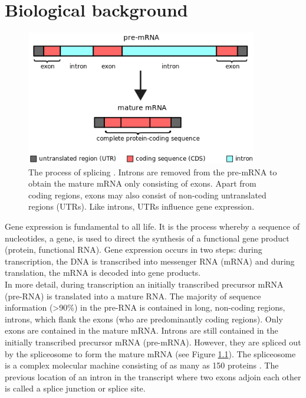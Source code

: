 \chapter{\label{ch:2-litreview}Biological background} %

\minitoc

\begin{figure}[h]
	\centering\includegraphics[width=0.9\textwidth]{../visualizations/ch2-biobackground/pre-mrna2mrna.png} 
	\caption
	{The process of splicing \cite{img:mrna}. Introns are removed from the pre-mRNA to obtain the mature mRNA only consisting of exons. Apart from coding regions, exons may also consist of non-coding untranslated regions (UTRs). Like introns, UTRs influence gene expression. 
	}
	\label{fig:pre-mrna2mrna}
\end{figure}

Gene expression is fundamental to all life. It is the process whereby a sequence of nucleotides, a gene, is used to direct the synthesis of a functional gene product (protein, functional RNA). Gene expression occurs in two steps: during transcription, the DNA is transcribed into messenger RNA (mRNA) and during translation, the mRNA is decoded into gene products.\\
In more detail, during transcription an initially transcribed precursor mRNA (pre-RNA) is translated into a mature RNA. 
The majority of sequence information (>90\%) in the pre-RNA is contained in long, non-coding regions, introns, which flank the exons (who are predominantly coding regions). 
Only exons are contained in the mature mRNA. Introns are still contained in the initially transcribed precursor mRNA (pre-mRNA). However, they are spliced out by the spliceosome to form the mature mRNA (see Figure \ref{fig:pre-mrna2mrna}). The spliceosome is a complex molecular machine consisting of as many as 150 proteins \cite{splicing_current_perspectives}. The previous location of an intron in the transcript where two exons adjoin each other is called a splice junction or splice site.

